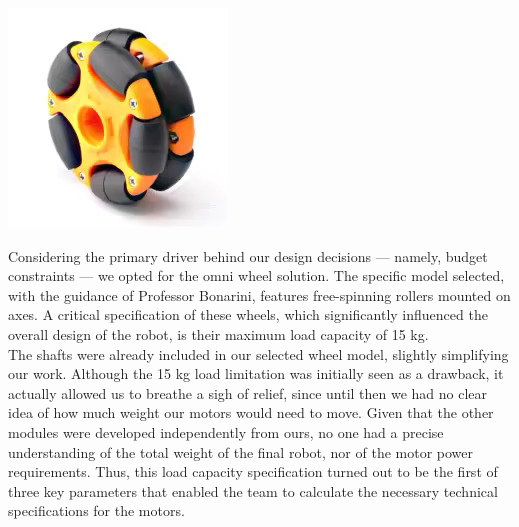 \documentclass{article}
\begin{document}
\noindent
\begin{minipage}[t]{0.4\textwidth}
  \vspace{0pt}
  \includegraphics[width=0.8\linewidth]{photos/wheel.jpg}
\end{minipage}
\hfill
\begin{minipage}[t]{0.6\textwidth}
    \vspace{0pt}
    Considering the primary driver behind our design decisions — namely, budget constraints — we opted for the omni wheel solution. The specific model selected, with the guidance of Professor Bonarini, features free-spinning rollers mounted on axes. A critical specification of these wheels, which significantly influenced the overall design of the robot, is their maximum load capacity of 15 kg. \\

    The shafts were already included in our selected wheel model, slightly simplifying our work. Although the 15 kg load limitation was initially seen as a drawback, it actually allowed us to breathe a sigh of relief, since until then we had no clear idea of how much weight our motors would need to move. Given that the other modules were developed independently from ours, no one had a precise understanding of the total weight of the final robot, nor of the motor power requirements. Thus, this load capacity specification turned out to be the first of three key parameters that enabled the team to calculate the necessary technical specifications for the motors. \\
\end{minipage}
\end{document}
